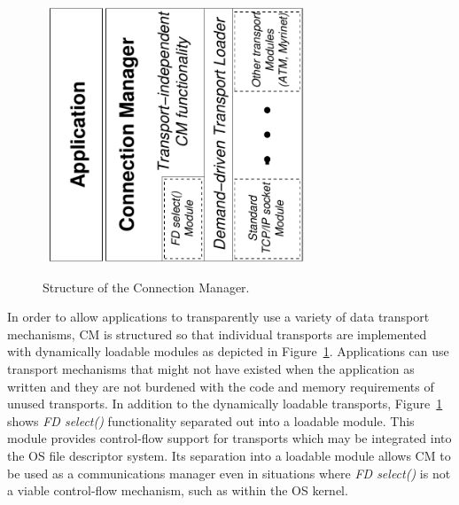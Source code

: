 \documentclass[11pt]{article}
\begin{document}
\begin{figure}
\vspace*{-0.35in}
\begin{center}\
\includegraphics[angle=270,width=3in]{struct.pdf}
\caption{Structure of the Connection Manager.\label{fig:struct}} 
\end{center}
\end{figure}
In order to allow applications to transparently use a variety of data
transport mechanisms, CM is structured so that individual transports are
implemented with dynamically loadable modules as depicted in
Figure~\ref{fig:struct}.  Applications can use transport mechanisms that
might not have existed when the application as written and they are not
burdened with the code and memory requirements of unused transports.  In
addition to the dynamically loadable transports, Figure~\ref{fig:struct}
shows {\it FD select()} functionality separated out into a loadable module.
This module provides control-flow support for transports which may be
integrated into the OS file descriptor system.  Its separation into a
loadable module allows CM to be used as a communications manager even in
situations where {\it FD select()} is not a viable control-flow mechanism,
such as within the OS kernel.
\end{document}

